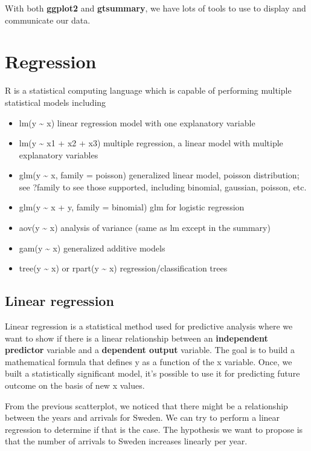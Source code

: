 \documentclass[
]{book}
\begin{document}
With both \textbf{ggplot2} and \textbf{gtsummary}, we have lots of tools to use to display and communicate our data.

\hypertarget{regression}{%
\chapter{Regression}\label{regression}}

R is a statistical computing language which is capable of performing multiple statistical models including

\begin{itemize}
\item
  lm(y \textasciitilde{} x) linear regression model with one explanatory variable
\item
  lm(y \textasciitilde{} x1 + x2 + x3) multiple regression, a linear model with multiple explanatory variables
\item
  glm(y \textasciitilde{} x, family = poisson) generalized linear model, poisson distribution; see ?family to see those supported, including binomial, gaussian, poisson, etc.
\item
  glm(y \textasciitilde{} x + y, family = binomial) glm for logistic regression
\item
  aov(y \textasciitilde{} x) analysis of variance (same as lm except in the summary)
\item
  gam(y \textasciitilde{} x) generalized additive models
\item
  tree(y \textasciitilde{} x) or rpart(y \textasciitilde{} x) regression/classification trees
\end{itemize}

\hypertarget{linear-regression}{%
\section{Linear regression}\label{linear-regression}}

Linear regression is a statistical method used for predictive analysis where we want to show if there is a linear relationship between an \textbf{independent predictor} variable and a \textbf{dependent output} variable. The goal is to build a mathematical formula that defines y as a function of the x variable. Once, we built a statistically significant model, it's possible to use it for predicting future outcome on the basis of new x values.

From the previous scatterplot, we noticed that there might be a relationship between the years and arrivals for Sweden. We can try to perform a linear regression to determine if that is the case. The hypothesis we want to propose is that the number of arrivals to Sweden increases linearly per year.
\end{document}
